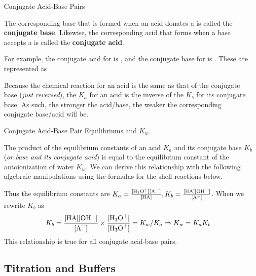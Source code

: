 \documentclass[10pt]{article}
\begin{document}
    \begin{core}{Conjugate Acid-Base Pairs}

      The corresponding base that is formed when an acid donates a  is called the \textbf{conjugate base}. Likewise, the corresponding acid that forms when a base accepts a  is called the \textbf{conjugate acid}.

      For example, the conjugate acid for  is , and the conjugate base for  is . These are represented as



      Because the chemical reaction for an acid is the same as that of the conjugate base (\textit{just reversed}), the $K_a$ for an acid is the inverse of the $K_b$ for its conjugate base. As such, the stronger the acid/base, the weaker the corresponding conjugate base/acid will be.  
      
    \end{core}

    \begin{core}{Conjugate Acid-Base Pair Equilibriums and $K_w$}

      The product of the equilibrium constants of an acid $K_a$ and its conjugate base $K_b$ (\textit{or base and its conjugate acid}) is equal to the equilibrium constant of the autoionization of water $K_w$. We can derive this relationship with the following algebraic manipulations using the formulas for the shell reactions below.



      Thus the equilibrium constants are $K_{a} = \frac{[\ce{H3O^+}][\ce{A-}]}{[\ce{HA}]} , K_{b} = \frac{[\ce{HA}][\ce{OH-}]}{[\ce{A-}]}$. When we rewrite $K_b$ as
      \[
        K_{b} = \frac{[\ce{HA}][\ce{OH-}]}{[\ce{A-}]} \times \frac{[\ce{H3O+}]}{[\ce{H3O+}]} = K_w/K_a \Rightarrow K_w = K_a K_b
      \]
      This relationship is true for all conjugate acid-base pairs. 
       
    \end{core}

  \subsection{Titration and Buffers}
\end{document}
